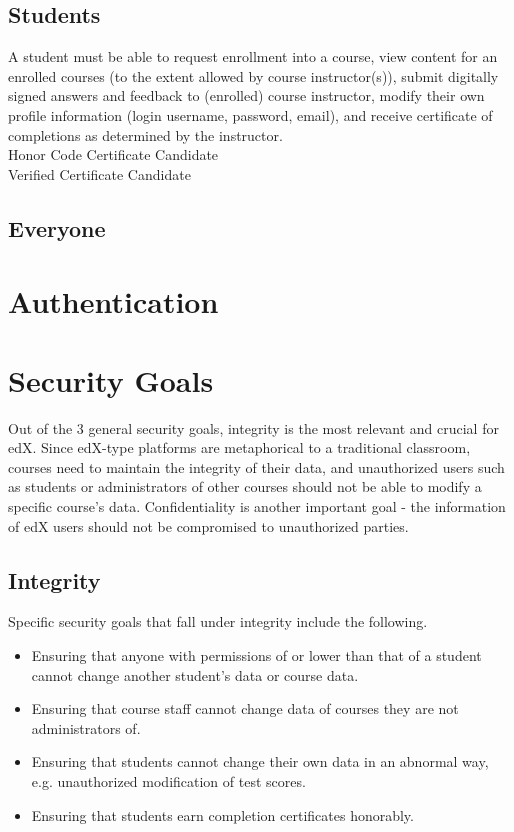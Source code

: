 \documentclass[11pt]{article}
\begin{document}
\subsection{Students}
A student must be able to request enrollment into a course, view content for an  enrolled courses (to the extent allowed by course instructor(s)), submit digitally signed answers and feedback to (enrolled) course instructor, modify their own profile information (login username, password, email), and receive certificate of completions as determined by the instructor.\\

Honor Code Certificate Candidate\\
Verified Certificate Candidate\\

\subsection{Everyone}

\section{Authentication}

\section{Security Goals}
Out of the 3 general security goals, integrity is the most relevant and crucial for edX. Since edX-type platforms are metaphorical to a traditional classroom, courses need to maintain the integrity of their data, and unauthorized users such as students or administrators of other courses should not be able to modify a specific course's data. Confidentiality is another important goal - the information of edX users should not be compromised to unauthorized parties.

\subsection{Integrity}
Specific security goals that fall under integrity include the following.
\begin{itemize}
\item Ensuring that anyone with permissions of or lower than that of a student cannot change another student's data or course data.
\item Ensuring that course staff cannot change data of courses they are not administrators of.
\item Ensuring that students cannot change their own data in an abnormal way, e.g. unauthorized modification of test scores.
\item Ensuring that students earn completion certificates honorably.
\end{itemize}
\end{document}
